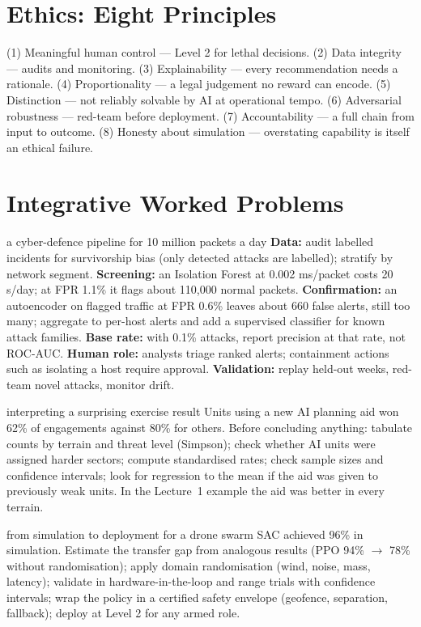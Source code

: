 \documentclass[11pt]{article}
\begin{document}
\section{Ethics: Eight Principles}
(1) Meaningful human control --- Level 2 for lethal decisions. (2) Data integrity --- audits and monitoring. (3) Explainability --- every recommendation needs a rationale. (4) Proportionality --- a legal judgement no reward can encode. (5) Distinction --- not reliably solvable by AI at operational tempo. (6) Adversarial robustness --- red-team before deployment. (7) Accountability --- a full chain from input to outcome. (8) Honesty about simulation --- overstating capability is itself an ethical failure.

\section{Integrative Worked Problems}
\begin{example}{a cyber-defence pipeline for 10 million packets a day}
\textbf{Data:} audit labelled incidents for survivorship bias (only detected attacks are labelled); stratify by network segment. \textbf{Screening:} an Isolation Forest at 0.002 ms/packet costs 20 s/day; at FPR 1.1\% it flags about 110,000 normal packets. \textbf{Confirmation:} an autoencoder on flagged traffic at FPR 0.6\% leaves about 660 false alerts, still too many; aggregate to per-host alerts and add a supervised classifier for known attack families. \textbf{Base rate:} with 0.1\% attacks, report precision at that rate, not ROC-AUC. \textbf{Human role:} analysts triage ranked alerts; containment actions such as isolating a host require approval. \textbf{Validation:} replay held-out weeks, red-team novel attacks, monitor drift.
\end{example}
\begin{example}{interpreting a surprising exercise result}
Units using a new AI planning aid won 62\% of engagements against 80\% for others. Before concluding anything: tabulate counts by terrain and threat level (Simpson); check whether AI units were assigned harder sectors; compute standardised rates; check sample sizes and confidence intervals; look for regression to the mean if the aid was given to previously weak units. In the Lecture~1 example the aid was better in every terrain.
\end{example}
\begin{example}{from simulation to deployment for a drone swarm}
SAC achieved 96\% in simulation. Estimate the transfer gap from analogous results (PPO 94\% $\to$ 78\% without randomisation); apply domain randomisation (wind, noise, mass, latency); validate in hardware-in-the-loop and range trials with confidence intervals; wrap the policy in a certified safety envelope (geofence, separation, fallback); deploy at Level 2 for any armed role.
\end{example}
\end{document}
